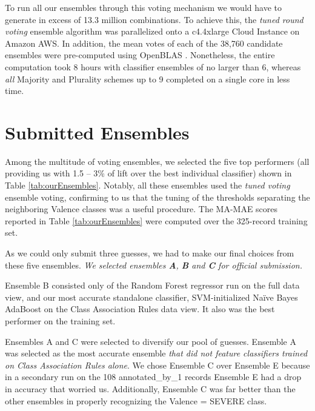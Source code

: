 To run all our ensembles through this voting mechanism we would have to generate
in excess of 13.3 million combinations. To achieve this,  the \textit{tuned round voting}
ensemble algorithm was parallelized onto a \textsf{c4.4xlarge} Cloud Instance on Amazon AWS. In addition, the mean votes of each of the 38,760 candidate ensembles were pre-computed using OpenBLAS \cite{open-blas}. Nonetheless, the entire computation took 8 hours with classifier ensembles of no larger than 6, whereas \textit{all}  Majority and Plurality schemes up to 9 completed on a single core in less time. %

\section{Submitted Ensembles}

Among the multitude of voting ensembles, we selected the five top performers (all
providing us with 1.5 -- 3\% of lift over the best individual
classifier) shown in Table \ref{tab:ourEnsembles}. Notably,
all these ensembles used the \textit{tuned voting} ensemble voting, confirming to us that the tuning of the thresholds
separating the neighboring \textsf{Valence} classes was a
useful procedure. The \textsf{MA-MAE} scores
reported in Table \ref{tab:ourEnsembles} were computed
over the 325-record training set.

As we could only submit three guesses, we had to make our final
choices from these five ensembles. 
\textit{
We selected ensembles \textbf{A}, \textbf{B} and \textbf{C} for official submission.}

\textsf{Ensemble B} consisted only of the Random Forest regressor
run on the full data view, and our most accurate standalone
classifier, SVM-initialized Na\"{i}ve Bayes AdaBoost on the Class Association
Rules data view. It also was the best performer on the training set.

\textsf{Ensembles A} and \textsf{C} were selected to diversify our 
pool of guesses. \textsf{Ensemble A} was
selected as the most accurate ensemble \textit{that did
not feature classifiers trained on Class Association Rules alone}.
We chose \textsf{Ensemble C} over \textsf{Ensemble E} because
in a secondary run on the 108 \textsf{annotated\_by\_1} records
\textsf{Ensemble E} had a drop in accuracy that worried us.
Additionally, \textsf{Ensemble C} was far better than the other
ensembles in properly recognizing the \textsf{Valence = SEVERE} class.




